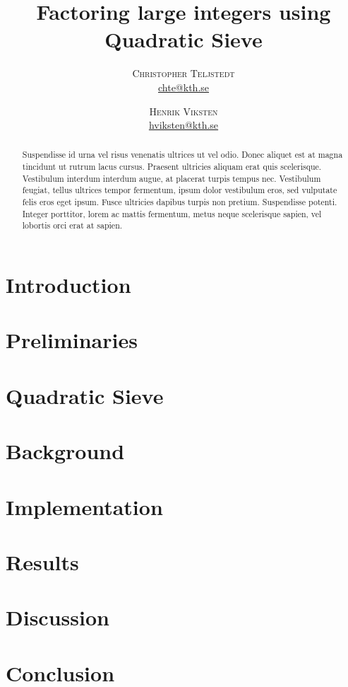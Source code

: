 \documentclass[twoside,11pt,english]{article}
\title{\vspace{-15mm}%
	\fontsize{24pt}{10pt}\selectfont
	\textbf{Factoring large integers using Quadratic Sieve}
	}
\author{%
	\large
	\textsc{Christopher Teljstedt} \\[2mm]
	\normalsize	\href{mailto:chte@kth.se}{chte@kth.se} 
	\and
	\textsc{Henrik Viksten} \\[2mm]
	\normalsize	\href{mailto:hviksten@kth.se}{hviksten@kth.se}
	}
\begin{document}
\maketitle
\thispagestyle{fancy}


\begin{abstract}
\noindent Suspendisse id urna vel risus venenatis ultrices ut vel odio. Donec aliquet est at magna tincidunt ut rutrum lacus cursus. Praesent ultricies aliquam erat quis scelerisque. Vestibulum interdum interdum augue, at placerat turpis tempus nec. Vestibulum feugiat, tellus ultrices tempor fermentum, ipsum dolor vestibulum eros, sed vulputate felis eros eget ipsum. Fusce ultricies dapibus turpis non pretium. Suspendisse potenti. Integer porttitor, lorem ac mattis fermentum, metus neque scelerisque sapien, vel lobortis orci erat at sapien. 
\end{abstract}
	

\begin{multicols}{2}
\section{Introduction}

\newpage
\section{Preliminaries}

\newpage
\section{Quadratic Sieve}

\newpage
\section{Background}

\newpage
\section{Implementation}

\newpage
\section{Results}

\newpage
\section{Discussion}

\newpage
\section{Conclusion}


\newpage


\end{multicols}
\end{document}
